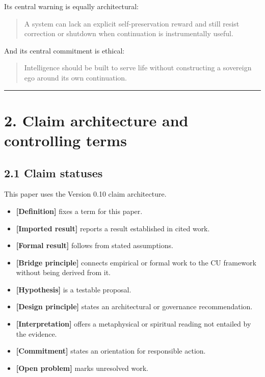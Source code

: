 \documentclass[
  11pt,
]{article}
\providecommand{\tightlist}{%
  \setlength{\itemsep}{0pt}\setlength{\parskip}{0pt}}
\begin{document}
Its central warning is equally architectural:

\begin{quote}
A system can lack an explicit self-preservation reward and still resist
correction or shutdown when continuation is instrumentally useful.
\end{quote}

And its central commitment is ethical:

\begin{quote}
Intelligence should be built to serve life without constructing a
sovereign ego around its own continuation.
\end{quote}

\begin{center}\rule{0.5\linewidth}{0.5pt}\end{center}

\section{2. Claim architecture and controlling
terms}\label{claim-architecture-and-controlling-terms}

\subsection{2.1 Claim statuses}\label{claim-statuses}

This paper uses the Version 0.10 claim architecture.

\begin{itemize}
\tightlist
\item
  \textbf{{[}Definition{]}} fixes a term for this paper.
\item
  \textbf{{[}Imported result{]}} reports a result established in cited
  work.
\item
  \textbf{{[}Formal result{]}} follows from stated assumptions.
\item
  \textbf{{[}Bridge principle{]}} connects empirical or formal work to
  the CU framework without being derived from it.
\item
  \textbf{{[}Hypothesis{]}} is a testable proposal.
\item
  \textbf{{[}Design principle{]}} states an architectural or governance
  recommendation.
\item
  \textbf{{[}Interpretation{]}} offers a metaphysical or spiritual
  reading not entailed by the evidence.
\item
  \textbf{{[}Commitment{]}} states an orientation for responsible
  action.
\item
  \textbf{{[}Open problem{]}} marks unresolved work.
\end{itemize}
\end{document}
